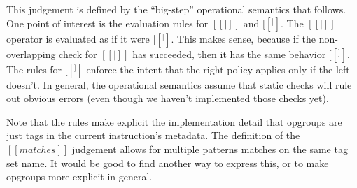 \documentclass[12pt]{article}
\newif\ifdraft
\newcommand{\cjc}[1]{\ifdraft{\color{Blue}[\textbf{CJC}: #1]}\fi}
\begin{document}
This judgement is defined by the ``big-step'' operational semantics that follows.
One point of interest is the evaluation rules for $[[|]]$ and $[[^]]$.  The
$[[|]]$ operator is evaluated as if it were $[[^]]$.  This makes sense, because
if the non-overlapping check for $[[|]]$ has succeeded, then it has the same
behavior $[[^]]$.  The rules for $[[^]]$ enforce the intent that the right
policy applies only if the left doesn't.  In general, the operational semantics
assume that static checks will rule out obvious errors (even though we haven't
implemented those checks yet).

Note that the rules make explicit the implementation detail that opgroups are
just tags in the current instruction's metadata.  The definition of the
$[[matches]]$ judgement allows for multiple patterns matches on the same tag set
name.  It would be good to find another way to express this, or to make opgroups
more explicit in general.

\cjc{This definition ignores the possibility of bound names for policies.  This
  isn't hard, I just need to add another environment/context.}

\bigskip

\ottdefnpev
\end{document}
